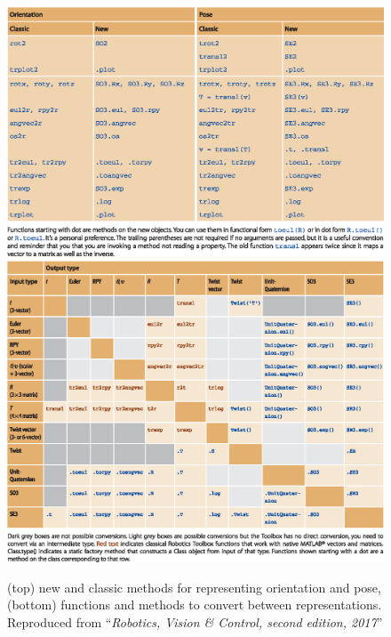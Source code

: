 \documentclass[a4paper,twoside]{report}
\begin{document}
\begin{figure}[p]
\centering
\includegraphics[width=\textwidth]{figs/CT-02-03.eps}
\includegraphics[width=\textwidth]{figs/CT-02-02.eps}
\caption{(top) new and classic methods for representing orientation and pose, (bottom) functions and methods to convert
between representations.  Reproduced from ``\textit{Robotics, Vision \& Control, second edition, 2017}''}\label{fig:newfunctions}
\end{figure}
\end{document}
